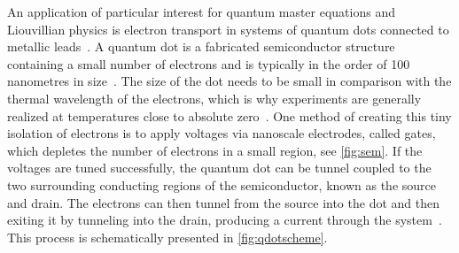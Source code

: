 \documentclass[../main.tex]{subfiles}
\begin{document}
An application of particular interest for quantum master equations and Liouvillian physics is electron transport in systems of quantum dots connected to metallic leads~\cite{qdottrans}. A quantum dot is a fabricated semiconductor structure containing a small number of electrons and is typically in the order of 100 nanometres in size~\cite{qdotmarcus}. The size of the dot needs to be small in comparison with the thermal wavelength of the electrons, which is why experiments are generally realized at temperatures close to absolute zero~\cite{transport}. One method of creating this tiny isolation of electrons is to apply voltages via nanoscale electrodes, called gates, which depletes the number of electrons in a small region, see \cref{fig:sem}. If the voltages are tuned successfully, the quantum dot can be tunnel coupled to the two surrounding conducting regions of the semiconductor, known as the source and drain. The electrons can then tunnel from the source into the dot and then exiting it by tunneling into the drain, producing a current through the system~\cite{qdotmarcus}. This process is schematically presented in \cref{fig:qdotscheme}.
\end{document}
